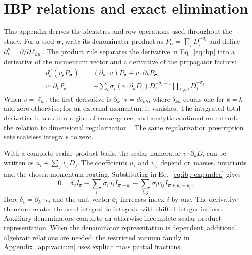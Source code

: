 \section{IBP relations and exact elimination}
\label{app:ibp}
This appendix derives the identities and row operations used throughout the study. For a seed $\boldsymbol\sigma$, write its denominator product as $P_{\boldsymbol\sigma}=\prod_iD_i^{-\sigma_i}$ and define $\partial_k^\mu=\partial/\partial\ell_{k\mu}$. The product rule separates the derivative in Eq.~\eqref{eq:ibp} into a derivative of the momentum vector and a derivative of the propagator factors:
\begin{align}
 \partial_k^\mu(v_\mu P_{\boldsymbol\sigma})
 &= (\partial_k\cdot v)P_{\boldsymbol\sigma}
       +v\cdot\partial_k P_{\boldsymbol\sigma},\\
 v\cdot\partial_k P_{\boldsymbol\sigma}
 &=-\sum_i\sigma_i(v\cdot\partial_kD_i)
       D_i^{-\sigma_i-1}\prod_{j\ne i}D_j^{-\sigma_j}.
 \label{eq:ibp-expanded}
\end{align}
When $v=\ell_h$, the first derivative is $\partial_k\cdot v=d\delta_{kh}$, where $\delta_{kh}$ equals one for $k=h$ and zero otherwise; for an external momentum it vanishes. The integrated total derivative is zero in a region of convergence, and analytic continuation extends the relation to dimensional regularization~\cite{ChetyrkinTkachov,Weinzierl2022}. The same regularization prescription sets scaleless integrals to zero.

With a complete scalar-product basis, the scalar numerator $v\cdot\partial_kD_i$ can be written as $u_i+\sum_j v_{ij}D_j$. The coefficients $u_i$ and $v_{ij}$ depend on masses, invariants and the chosen momentum routing. Substituting in Eq.~\eqref{eq:ibp-expanded} gives
\begin{equation}
 0=\delta_v I_{\boldsymbol\sigma}
 -\sum_i\sigma_i u_i I_{\boldsymbol\sigma+\boldsymbol e_i}
 -\sum_{i,j}\sigma_i v_{ij}
       I_{\boldsymbol\sigma+\boldsymbol e_i-\boldsymbol e_j},
 \label{eq:ibp-shifts}
\end{equation}
Here $\delta_v=\partial_k\cdot v$, and the unit vector $\boldsymbol e_i$ increases index $i$ by one. The derivative therefore relates the seed integral to integrals with shifted integer indices. Auxiliary denominators complete an otherwise incomplete scalar-product representation. When the denominator representation is dependent, additional algebraic relations are needed; the restricted vacuum family in Appendix~\ref{app:vacuum} uses explicit mass partial fractions.

